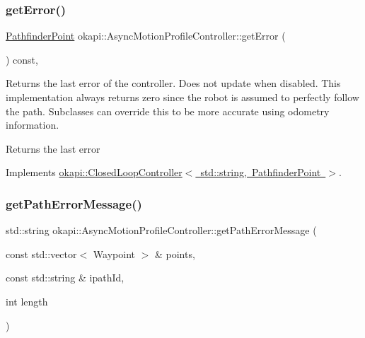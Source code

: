 \subsubsection{\texorpdfstring{getError()}{getError()}}
{\footnotesize\ttfamily \mbox{\hyperlink{structokapi_1_1PathfinderPoint}{Pathfinder\+Point}} okapi\+::\+Async\+Motion\+Profile\+Controller\+::get\+Error (\begin{DoxyParamCaption}{ }\end{DoxyParamCaption}) const\hspace{0.3cm}{\ttfamily [override]}, {\ttfamily [virtual]}}

Returns the last error of the controller. Does not update when disabled. This implementation always returns zero since the robot is assumed to perfectly follow the path. Subclasses can override this to be more accurate using odometry information.

\begin{DoxyReturn}{Returns}
the last error 
\end{DoxyReturn}


Implements \mbox{\hyperlink{classokapi_1_1ClosedLoopController_a50c73444ff6e3e631951c43d0f951953}{okapi\+::\+Closed\+Loop\+Controller$<$ std\+::string, Pathfinder\+Point $>$}}.

\mbox{\label{classokapi_1_1AsyncMotionProfileController_add71d15d34ef8c10205c3b6791e32f71}} 
\subsubsection{\texorpdfstring{getPathErrorMessage()}{getPathErrorMessage()}}
{\footnotesize\ttfamily std\+::string okapi\+::\+Async\+Motion\+Profile\+Controller\+::get\+Path\+Error\+Message (\begin{DoxyParamCaption}\item[{const std\+::vector$<$ Waypoint $>$ \&}]{points,  }\item[{const std\+::string \&}]{ipath\+Id,  }\item[{int}]{length }\end{DoxyParamCaption})\hspace{0.3cm}{\ttfamily [protected]}}

